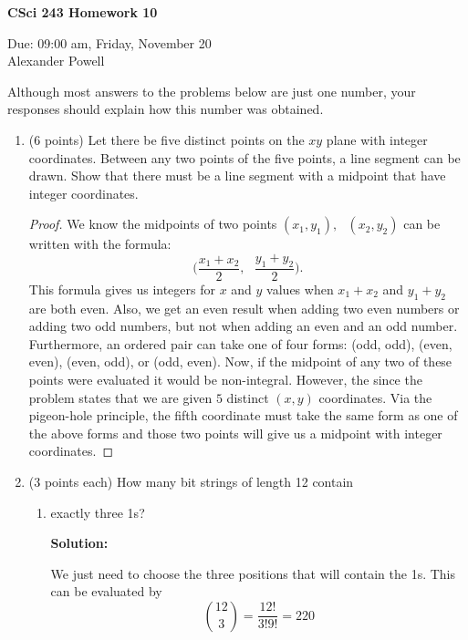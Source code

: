 \documentclass[11pt]{article}
\begin{document}
\begin{center}             %
\begin{LARGE}
{\bf CSci 243 Homework 10}
\end{LARGE}
\vskip 0.25cm      %

Due: 09:00 am, Friday, November 20 \\  %
Alexander Powell
\end{center}
Although most answers to the problems below are just one number, 
 your responses should explain how this number was obtained.

\begin{enumerate}

\item (6 points) 
Let there be five distinct points on the $xy$ plane with integer coordinates.
Between any two points of the five points, a line segment can be drawn.
Show that there must be a line segment with a midpoint that have integer 
coordinates.

\begin{proof}
We know the midpoints of two points $(x_1,y_1), \text{ } (x_2,y_2)$ can be written with the formula:
$$ \bigg( \dfrac{x_1 + x_2}{2}, \text{ } \dfrac{y_1 + y_2}{2} \bigg). $$
This formula gives us integers for $x$ and $y$ values when $x_1+x_2$ and $y_1+y_2$ are both even.  Also, we get an even result when adding two even numbers or adding two odd numbers, but not when adding an even and an odd number.  Furthermore, an ordered pair can take one of four forms: (odd, odd), (even, even), (even, odd), or (odd, even).  Now, if the midpoint of any two of these points were evaluated it would be non-integral.  However, the since the problem states that we are given $5$ distinct $(x,y)$ coordinates.  Via the pigeon-hole principle, the fifth coordinate must take the same form as one of the above forms and those two points will give us a midpoint with integer coordinates.  
\end{proof}

\item (3 points each) How many bit strings of length 12 contain
\begin{enumerate}
\item exactly three 1s? 

\textbf{Solution: }

We just need to choose the three positions that will contain the 1s.  This can be evaluated by
$$ {12 \choose 3} = \dfrac{12!}{3!9!} = 220 $$


\end{enumerate}
\end{enumerate}
\end{document}
